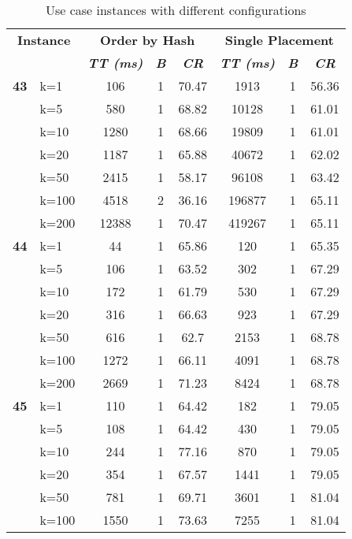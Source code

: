 \begin{table}[htbp]
    \caption{Use case instances with different configurations}
    \begin{tabular}{ll|ccc|ccc}
    
    \multicolumn{ 2}{c|}{\textbf{Instance}} & \multicolumn{ 3}{c|}{\textbf{Order by Hash}} & \multicolumn{ 3}{c}{\textbf{Single Placement}} \\ 
    \multicolumn{ 2}{l|}{} & \textbf{\textit{TT (ms)}} & \textbf{\textit{B}} & \textbf{\textit{CR}} & \textbf{\textit{TT (ms)}} & \textbf{\textit{B}} & \textbf{\textit{CR}} \\ \hline
    \multicolumn{1}{r}{\textbf{43}} & k=1 & 106 & 1 & 70.47 & 1913 & 1 & 56.36 \\ 
     & k=5 & 580 & 1 & 68.82 & 10128 & 1 & 61.01 \\ 
     & k=10 & 1280 & 1 & 68.66 & 19809 & 1 & 61.01 \\ 
     & k=20 & 1187 & 1 & 65.88 & 40672 & 1 & 62.02 \\ 
     & k=50 & 2415 & 1 & 58.17 & 96108 & 1 & 63.42 \\ 
     & k=100 & 4518 & 2 & 36.16 & 196877 & 1 & 65.11 \\ 
     & k=200 & 12388 & 1 & 70.47 & 419267 & 1 & 65.11 \\ \hline
    \multicolumn{1}{r}{\textbf{44}} & k=1 & 44 & 1 & 65.86 & 120 & 1 & 65.35 \\ 
     & k=5 & 106 & 1 & 63.52 & 302 & 1 & 67.29 \\ 
     & k=10 & 172 & 1 & 61.79 & 530 & 1 & 67.29 \\ 
     & k=20 & 316 & 1 & 66.63 & 923 & 1 & 67.29 \\ 
     & k=50 & 616 & 1 & 62.7 & 2153 & 1 & 68.78 \\ 
     & k=100 & 1272 & 1 & 66.11 & 4091 & 1 & 68.78 \\ 
     & k=200 & 2669 & 1 & 71.23 & 8424 & 1 & 68.78 \\ \hline
    \multicolumn{1}{r}{\textbf{45}} & k=1 & 110 & 1 & 64.42 & 182 & 1 & 79.05 \\ 
     & k=5 & 108 & 1 & 64.42 & 430 & 1 & 79.05 \\ 
     & k=10 & 244 & 1 & 77.16 & 870 & 1 & 79.05 \\ 
     & k=20 & 354 & 1 & 67.57 & 1441 & 1 & 79.05 \\ 
     & k=50 & 781 & 1 & 69.71 & 3601 & 1 & 81.04 \\ 
     & k=100 & 1550 & 1 & 73.63 & 7255 & 1 & 81.04 \\ 

\end{tabular}
\end{table}
